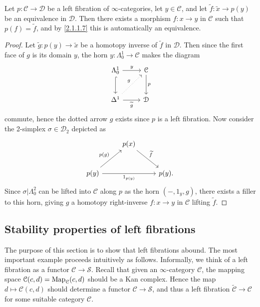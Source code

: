 \begin{proposition}\label{2.1.1.8}
	Let $p : \mathcal{C}  \to \mathcal{D} $ be a left fibration of $\infty $-categories, let $y\in \mathcal{C} $, and let $\widetilde{f} : \widetilde{x}  \to p(y)$ be an equivalence in $\mathcal{D} $. Then there exists a morphism $f : x \to y$ in $\mathcal{C} $ such that $p(f)=\widetilde{f} $, and by \cref{2.1.1.7} this is automatically an equivalence.
\end{proposition}
\begin{proof}
	Let $\widetilde{g} : p(y) \to \widetilde{x}$ be a homotopy inverse of $\widetilde{f} $ in $\mathcal{D} $. Then since the first face of $g$ is its domain $y$, the horn $y : \Lambda _0^1 \to \mathcal{C} $ makes the diagram
	\[\begin{tikzcd}[row sep = 2.5em, column sep = 2.5em]
	\Lambda _0^1 \ar[" y ", r] \ar[hook, d]  & \mathcal{C} \ar[" p ", d]  \\
	\Delta ^1 \ar[" \widetilde{g} "', r] \ar[" g ",dotted,  ur]  & \mathcal{D} 
	\end{tikzcd}\]
	commute, hence the dotted arrow $g$ exists since $p$ is a left fibration. Now consider the 2-simplex $\sigma \in \mathcal{D} _2$ depicted as
	\[\begin{tikzcd}[row sep = 2.5em, column sep = 2.5em]
	 & p(x) \ar[" \widetilde{f}  ", dr]  &  \\
	p(y) \ar[" p(g) ", ur] \ar[" 1_{p(y)}  "', rr]  &  & p(y).
	\end{tikzcd}\]
	Since $\sigma |\Lambda _0^2$ can be lifted into $\mathcal{C} $ along $p$ as the horn $(-,1_y,g)$, there exists a filler to this horn, giving $g$ a homotopy right-inverse $f : x \to y$ in $\mathcal{C} $ lifting $\widetilde{f} $.
\end{proof}

\subsection{Stability properties of left fibrations}

The purpose of this section is to show that left fibrations abound. The most important example proceeds intuitively as follows. Informally, we think of a left fibration as a functor $\mathcal{C} \to \mathcal{S} $. Recall that given an $\infty $-category $\mathcal{C} $, the mapping space $\mathcal{C} (c,d)=\operatorname{Map}_{\mathcal{C} }(c,d) $ should be a Kan complex. Hence the map $d\mapsto \mathcal{C} (c,d)$ should determine a functor $\mathcal{C} \to \mathcal{S} $, and thus a left fibration $\widetilde{\mathcal{C} } \to \mathcal{C} $ for some suitable category $\mathcal{C} $.

